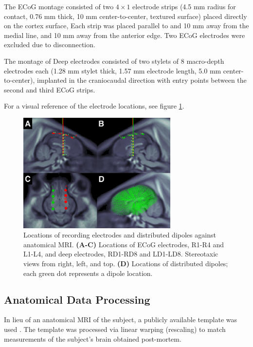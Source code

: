 \documentclass[draftcls, onecolumn, peerreview]{IEEEtran}
\begin{document}
The ECoG montage consisted of 
two $4\times 1$ electrode strips
(4.5 mm radius for contact, 0.76 mm thick, 10 mm center-to-center, textured surface)
placed directly on the cortex surface,
%
Each strip was placed parallel to and 10 mm away from the medial line, and 10 mm away from the anterior edge.
%
Two ECoG electrodes were excluded due to disconnection.

The montage of Deep electrodes consisted of two stylets of 
8 macro-depth electrodes each
(1.28 mm stylet thick, 1.57 mm electrode length, 5.0 mm center-to-center),
implanted in the craniocaudal direction with entry points between the second and third ECoG strips. 

For a visual reference of the electrode locations, see figure \ref{fig:elecs}.




\begin{figure}[!t]
\centering
\includegraphics[width=8cm]{./img/electrodes_v2}
\caption{Locations of recording electrodes and distributed dipoles against anatomical MRI.
\textbf{(A-C)} Locations of ECoG electrodes, R1-R4 and L1-L4, and deep electrodes, RD1-RD8 and LD1-LD8. Stereotaxic views from right, left, and top. 
\textbf{(D)} Locations of distributed dipoles; each green dot represents a dipole location. }
\label{fig:elecs}       %
\end{figure}


\subsection{Anatomical Data Processing}

In lieu of an anatomical MRI of the subject, a publicly available template was used
\cite{pig_template}.
%
The template was processed via linear warping (rescaling) to match measurements of the subject's brain obtained post-mortem.
\end{document}
